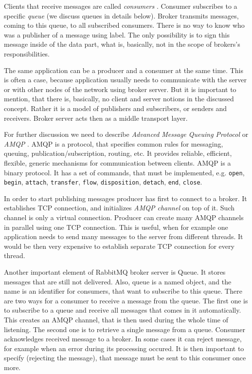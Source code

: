 Clients that receive messages are called \textit{consumers} .
Consumer subscribes to a specific \textit{queue} (we discuss queues in details below).
Broker transmits messages, coming to this queue, to all subscribed consumers.
There is no way to know who was a publisher of a message using label.
The only possibility is to sign this message inside of the data part, what is, basically, not in the scope of brokers's responsibilities.

The same application can be a producer and a consumer at the same time.
This is often a case, because application usually needs to communicate with the server or with other nodes of the network using broker server.
But it is important to mention, that there is, basically, no client and server notions in the discussed concept.
Rather it is a model of publishers and subscribers, or senders and receivers.
Broker server acts then as a middle transport layer.

For further discussion we need to describe \textit{Advanced Message Queuing Protocol}  or \textit{AMQP} \cite{AMQP2011}.
AMQP is a protocol, that specifies common rules for messaging, queuing, publication/subscription, routing, etc.
It provides reliable, efficient, flexible, generic mechanisms for communication between clients.
AMQP is a binary protocol.
It has a set of commands, that must be implemented, e.g. \lstinline{open}, \lstinline{begin}, \lstinline{attach}, \lstinline{transfer}, \lstinline{flow}, \lstinline{disposition}, \lstinline{detach}, \lstinline{end}, \lstinline{close}.

In order to start publishing messages producer has first to connect to a broker.
It establishes TCP connection, and initializes \textit{AMQP channel}  on top of it.
Such channel is only a virtual connection.
Producer can create many AMQP channels in parallel using one TCP connection.
This is useful, when for example one application needs to send many messages to the server from different threads.
It would be then very expensive to establish separate TCP connection for every thread.

Another important element of RabbitMQ broker server is Queue.
It stores messages that are still not delivered.
Also, queue is a named object, and the name is an identifier for consumers, that want to subscribe to this queue.
There are two ways for a consumer to receive a message from the queue.
The first one is to subscribe to a queue and receive all messages that comes in it automatically.
This creates an AMQP channel, that is then used during the whole time of listening.
The second one is to retrieve a single message from a queue.
Consumer acknowledges received message to a broker.
In some cases it can reject message, for example when an error during its processing occured.
It is then important to specify (rejecting the message), that message must be sent to this consumer once more.


